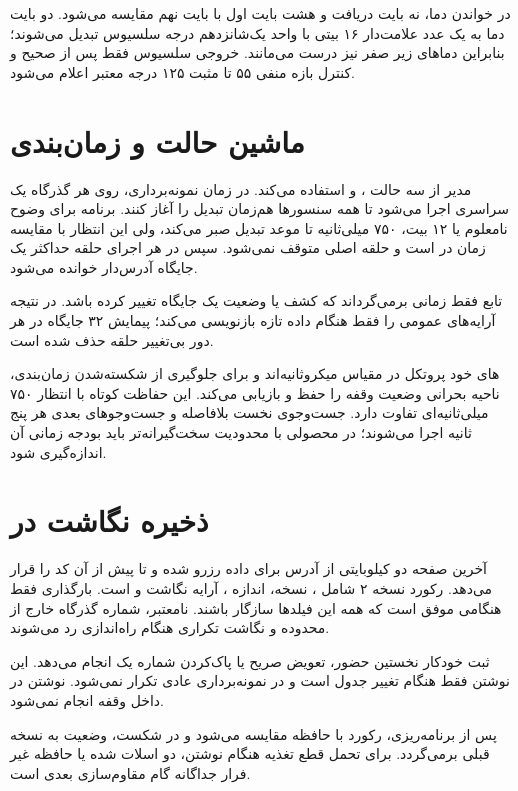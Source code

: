 در خواندن دما، نه بایت  دریافت و  هشت بایت اول با بایت نهم مقایسه می‌شود. دو بایت دما به یک عدد علامت‌دار ۱۶ بیتی با واحد یک‌شانزدهم درجه سلسیوس تبدیل می‌شوند؛ بنابراین دماهای زیر صفر نیز درست می‌مانند. خروجی سلسیوس فقط پس از  صحیح و کنترل بازه منفی ۵۵ تا مثبت ۱۲۵ درجه معتبر اعلام می‌شود.

\section{ماشین حالت و زمان‌بندی}
مدیر از سه حالت ،  و  استفاده می‌کند. در زمان نمونه‌برداری، روی هر گذرگاه یک  سراسری اجرا می‌شود تا همه سنسورها هم‌زمان تبدیل را آغاز کنند. برنامه برای وضوح نامعلوم یا ۱۲ بیت، ۷۵۰ میلی‌ثانیه تا موعد تبدیل صبر می‌کند، ولی این انتظار با مقایسه زمان در  است و حلقه اصلی متوقف نمی‌شود. سپس در هر اجرای حلقه حداکثر یک جایگاه آدرس‌دار خوانده می‌شود.

تابع  فقط زمانی  برمی‌گرداند که کشف یا وضعیت یک جایگاه تغییر کرده باشد. در نتیجه  آرایه‌های عمومی را فقط هنگام داده تازه بازنویسی می‌کند؛ پیمایش ۳۲ جایگاه در هر دور بی‌تغییر حلقه حذف شده است.

های خود پروتکل در مقیاس میکروثانیه‌اند و برای جلوگیری از شکسته‌شدن زمان‌بندی،  ناحیه بحرانی وضعیت وقفه را حفظ و بازیابی می‌کند. این حفاظت کوتاه با انتظار ۷۵۰ میلی‌ثانیه‌ای تفاوت دارد. جست‌وجوی نخست بلافاصله و جست‌وجوهای بعدی هر پنج ثانیه اجرا می‌شوند؛ در محصولی با محدودیت  سخت‌گیرانه‌تر باید بودجه زمانی آن اندازه‌گیری شود.

\section{ذخیره نگاشت در }
آخرین صفحه دو کیلوبایتی  از آدرس
برای داده رزرو شده و  تا پیش از آن کد را قرار می‌دهد. رکورد نسخه ۲ شامل ، نسخه، اندازه ، آرایه نگاشت و  است. بارگذاری فقط هنگامی موفق است که همه این فیلدها سازگار باشند.  نامعتبر، شماره گذرگاه خارج از محدوده و نگاشت تکراری هنگام راه‌اندازی رد می‌شوند.

ثبت خودکار نخستین حضور، تعویض صریح یا پاک‌کردن شماره یک  انجام می‌دهد. این نوشتن فقط هنگام تغییر جدول است و در نمونه‌برداری عادی تکرار نمی‌شود. نوشتن در  داخل وقفه انجام نمی‌شود.

پس از برنامه‌ریزی، رکورد با حافظه مقایسه می‌شود و در شکست، وضعیت  به نسخه قبلی برمی‌گردد. برای تحمل قطع تغذیه هنگام نوشتن، دو اسلات  شده یا حافظه غیر فرار جداگانه گام مقاوم‌سازی بعدی است.

